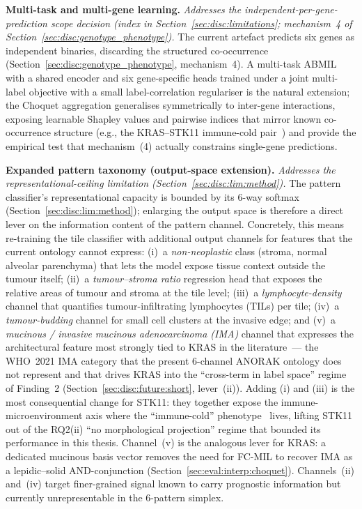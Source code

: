 \textbf{Multi-task and multi-gene learning.}
\emph{Addresses the independent-per-gene-prediction scope
decision (index in Section~\ref{sec:disc:limitations};
mechanism~4 of Section~\ref{sec:disc:genotype_phenotype}).}
The current artefact predicts six genes as independent binaries,
discarding the structured co-occurrence
(Section~\ref{sec:disc:genotype_phenotype}, mechanism~4).
A multi-task ABMIL with a shared encoder and six gene-specific
heads trained under a joint multi-label objective with a small
label-correlation regulariser is the natural extension; the
Choquet aggregation generalises symmetrically to inter-gene
interactions, exposing learnable Shapley values and pairwise
indices that mirror known co-occurrence structure (e.g., the
KRAS--STK11 immune-cold
pair~\cite{skoulidis2018stk11pd1}) and provide the empirical
test that mechanism~(4) actually constrains single-gene
predictions.

\textbf{Expanded pattern taxonomy (output-space extension).}
\emph{Addresses the representational-ceiling limitation
(Section~\ref{sec:disc:lim:method}).}
The pattern classifier's representational capacity is bounded by
its 6-way softmax (Section~\ref{sec:disc:lim:method}); enlarging
the output space is therefore a direct lever on the information
content of the pattern channel.
Concretely, this means re-training the tile classifier with
additional output channels for features that the current
ontology cannot express:
(i)~a \emph{non-neoplastic} class (stroma, normal alveolar
parenchyma) that lets the model expose tissue context outside the
tumour itself;
(ii)~a \emph{tumour--stroma ratio} regression head that exposes
the relative areas of tumour and stroma at the tile level;
(iii)~a \emph{lymphocyte-density} channel that quantifies
tumour-infiltrating lymphocytes (TILs) per tile;
(iv)~a \emph{tumour-budding} channel for small cell clusters
at the invasive edge;
and (v)~a \emph{mucinous / invasive mucinous adenocarcinoma (IMA)}
channel that expresses the architectural feature most strongly
tied to KRAS in the
literature~\cite{shim2015krasmucinous,rekhtman2013krassolid}---
the WHO~2021 IMA category that the present 6-channel ANORAK
ontology does not represent and that drives KRAS into the
``cross-term in label space'' regime of Finding~2
(Section~\ref{sec:disc:future:short}, lever~(ii)).
Adding (i) and (iii) is the most consequential change for STK11:
they together expose the immune-microenvironment axis where the
``immune-cold'' phenotype~\cite{skoulidis2018stk11pd1} lives,
lifting STK11 out of the RQ2(ii) ``no morphological projection''
regime that bounded its performance in this thesis.
Channel~(v) is the analogous lever for KRAS: a dedicated mucinous
basis vector removes the need for FC-MIL to recover IMA as a
lepidic--solid AND-conjunction
(Section~\ref{sec:eval:interp:choquet}).
Channels~(ii) and~(iv) target finer-grained signal known to carry
prognostic information but currently unrepresentable in the
6-pattern simplex.


